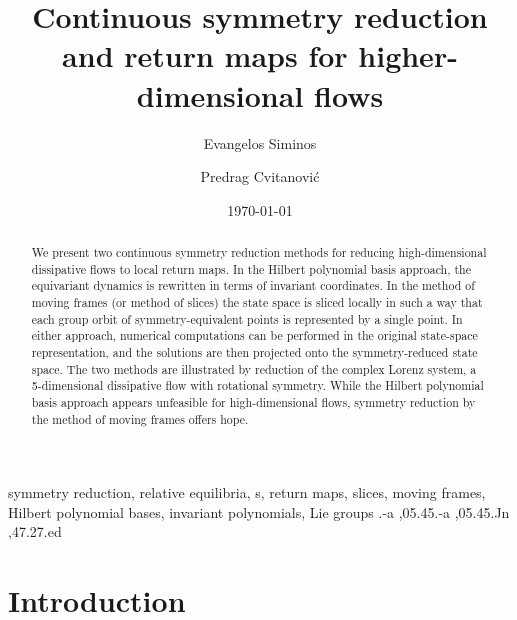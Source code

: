 \documentclass[preprint,number,sort&compress]{elsarticle}
\begin{document}
\begin{frontmatter}

			\title{
Continuous symmetry reduction and return maps for higher-dimensional flows
			}

\author{Evangelos Siminos}
\author{Predrag Cvitanovi\'c}
\address{Center for Nonlinear Science,
        School of Physics, Georgia Institute of Technology,
        Atlanta, GA 30332-0430}

\date{\today}

        \begin{abstract}
We present two continuous symmetry reduction methods for
reducing high-dimensional dissipative flows to local return
maps. In the Hilbert polynomial basis approach, the equi\-vari\-ant
dynamics is rewritten in terms of in\-vari\-ant coordinates. In the
method of moving frames (or method of slices) the state space
is sliced locally in such a way that each group orbit of
symmetry-equivalent points is represented by a single point. In
either approach, numerical computations can be performed in the
original state-space representation, and the solutions are then
projected onto the symmetry-reduced state space. The two methods
are illustrated by reduction of the complex Lorenz system, a
5-dimensional dissipative flow with rotational symmetry. While
the Hilbert polynomial basis approach appears unfeasible for
high-dimensional flows, symmetry reduction by the method of
moving frames offers hope.
        \end{abstract}

\begin{keyword}
symmetry reduction,
relative equilibria,
\rpo s,
return maps,
slices,
moving frames,
Hilbert polynomial bases,
invariant polynomials,
Lie groups
.-a \sep 05.45.-a \sep 05.45.Jn \sep 47.27.ed
\end{keyword}
\end{frontmatter}

\section{\label{s:intro} Introduction}
\end{document}
